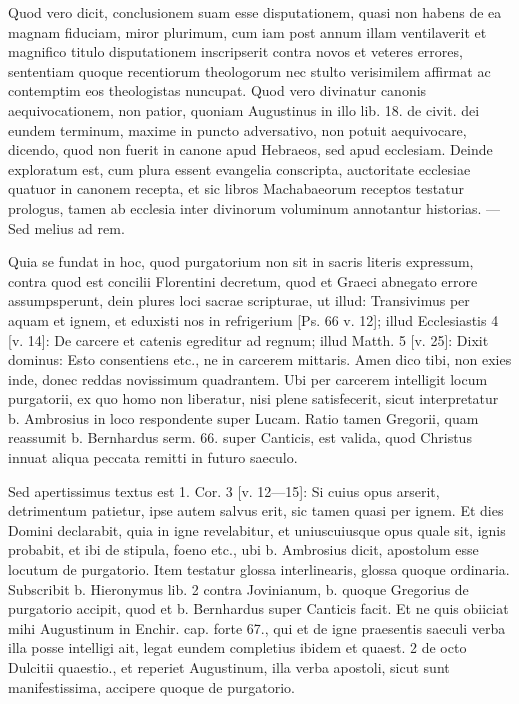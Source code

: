 Quod vero dicit, conclusionem suam esse disputationem, quasi non habens de ea magnam fiduciam, miror plurimum, cum iam post annum illam ventilaverit et magnifico titulo disputationem inscripserit contra novos et veteres errores, sententiam quoque recentiorum theologorum nec stulto verisimilem affirmat ac contemptim eos theologistas nuncupat. Quod vero divinatur canonis aequivocationem, non patior, quoniam Augustinus in illo lib. 18. de civit. dei eundem terminum, maxime in puncto adversativo, non potuit aequivocare, dicendo, quod non fuerit in canone apud Hebraeos, sed apud ecclesiam. Deinde exploratum est, cum plura essent evangelia conscripta, auctoritate ecclesiae quatuor in canonem recepta, et sic libros Machabaeorum receptos testatur prologus, tamen ab ecclesia inter divinorum voluminum annotantur historias. — Sed melius ad rem.

Quia se fundat in hoc, quod purgatorium non sit in sacris literis expressum, contra quod est concilii Florentini decretum, quod et Graeci abnegato errore assumpsperunt, dein plures loci sacrae scripturae, ut illud: Transivimus per aquam et ignem, et eduxisti nos in refrigerium [Ps. 66 v. 12]; illud Ecclesiastis 4 [v. 14]: De carcere et catenis egreditur ad regnum; illud Matth. 5 [v. 25]: Dixit dominus: Esto consentiens etc., ne in carcerem mittaris. Amen dico tibi, non exies inde, donec reddas novissimum quadrantem. Ubi per carcerem intelligit locum purgatorii, ex quo homo non liberatur, nisi plene satisfecerit, sicut interpretatur b. Ambrosius in loco respondente super Lucam. Ratio tamen Gregorii, quam reassumit b. Bernhardus serm. 66. super Canticis, est valida, quod Christus innuat aliqua peccata remitti in futuro saeculo.

Sed apertissimus textus est 1. Cor. 3 [v. 12—15]: Si cuius opus arserit, detrimentum patietur, ipse autem salvus erit, sic tamen quasi per ignem. Et dies Domini declarabit, quia in igne revelabitur, et uniuscuiusque opus quale sit, ignis probabit, et ibi de stipula, foeno etc., ubi b. Ambrosius dicit, apostolum esse locutum de purgatorio. Item testatur glossa interlinearis, glossa quoque ordinaria. Subscribit b. Hieronymus lib. 2 contra Jovinianum, b. quoque Gregorius de purgatorio accipit, quod et b. Bernhardus super Canticis facit. Et ne quis obiiciat mihi Augustinum in Enchir. cap. forte 67., qui et de igne praesentis saeculi verba illa posse intelligi ait, legat eundem completius ibidem et quaest. 2 de octo Dulcitii quaestio., et reperiet Augustinum, illa verba apostoli, sicut sunt manifestissima, accipere quoque de purgatorio.

